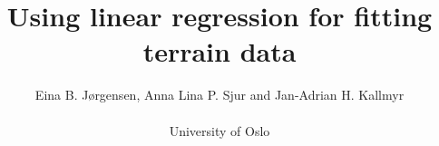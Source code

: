 \documentclass[a4paper, 11pt, twocolumn]{article}
\begin{document}
\title{Using linear regression for fitting terrain data}

\author{Eina B. Jørgensen, Anna Lina P. Sjur and Jan-Adrian H. Kallmyr \\\\ University of Oslo}

\twocolumn[
  \begin{@twocolumnfalse}
    \maketitle
    
  \end{@twocolumnfalse}
]

















\end{document}
